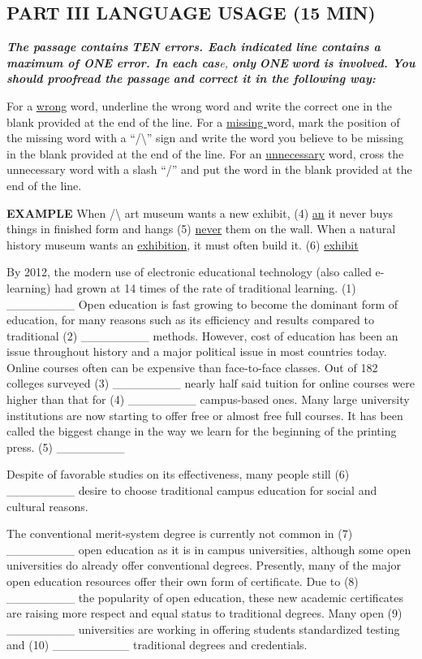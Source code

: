 \documentclass[UTF8,11pt]{ctexart}
\begin{document}
\subsection*{\textbf{PART III LANGUAGE USAGE (15 MIN)}}


\textbf{\textit{The passage contains}} \textbf{\textit{TEN errors. Each indicated line contains a maximum of ONE error. In each cas}}\textit{e, }\textbf{\textit{only}} \textbf{\textit{ONE}} \textbf{\textit{word is involved. You should proofread the passage}} \textbf{\textit{and correct it in the following way:}}


For a \uline{wrong} word, underline the wrong word and write the correct one in the blank provided at the end of the line. For a \uline{missing }word, mark the position of the missing word with a “/\textbackslash{}” sign and write the word you believe to be missing in the blank provided at the end of the line. For an \uline{unnecessary} word, cross the unnecessary word with a slash “/” and put the word in the blank provided at the end of the line.


\textbf{EXAMPLE} When /\textbackslash{} art museum wants a new exhibit, (4) \uline{an} it never buys things in finished form and hangs (5) \uline{never} them on the wall. When a natural history museum wants an \uline{exhibition}, it must often build it. (6) \uline{exhibit}


By 2012, the modern use of electronic educational technology (also called e-learning) had grown at 14 times of the rate of traditional learning. (1) \_\_\_\_\_\_\_\_ Open education is fast growing to become the dominant form of education, for many reasons such as its efficiency and results compared to traditional (2) \_\_\_\_\_\_\_\_ methods. However, cost of education has been an issue throughout history and a major political issue in most countries today. Online courses often can be expensive than face-to-face classes. Out of 182 colleges surveyed (3) \_\_\_\_\_\_\_\_ nearly half said tuition for online courses were higher than that for (4) \_\_\_\_\_\_\_\_ campus-based ones. Many large university institutions are now starting to offer free or almost free full courses. It has been called the biggest change in the way we learn for the beginning of the printing press. (5) \_\_\_\_\_\_\_\_


Despite of favorable studies on its effectiveness, many people still (6) \_\_\_\_\_\_\_\_ desire to choose traditional campus education for social and cultural reasons.


The conventional merit-system degree is currently not common in (7) \_\_\_\_\_\_\_\_ open education as it is in campus universities, although some open universities do already offer conventional degrees. Presently, many of the major open education resources offer their own form of certificate. Due to (8) \_\_\_\_\_\_\_\_ the popularity of open education, these new academic certificates are raising more respect and equal status to traditional degrees. Many open (9) \_\_\_\_\_\_\_\_ universities are working in offering students standardized testing and (10) \_\_\_\_\_\_\_\_\_ traditional degrees and credentials.
\end{document}

